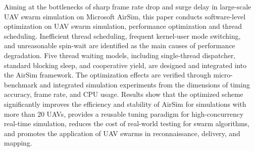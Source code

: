 

\begin{abstracten}

Aiming at the bottlenecks of sharp frame rate drop and surge delay in
large-scale UAV swarm simulation on Microsoft AirSim, this paper
conducts software-level optimization on UAV swarm simulation,
performance optimization and thread scheduling.  Inefficient thread
scheduling, frequent kernel-user mode switching, and unreasonable
spin-wait are identified as the main causes of performance degradation.
Five thread waiting models, including single-thread dispatcher, standard
blocking sleep, and cooperative yield, are designed and integrated into
the AirSim framework. The optimization effects are verified through
micro-benchmark and integrated simulation experiments from the
dimensions of timing accuracy, frame rate, and CPU usage. Results show
that the optimized scheme significantly improves the efficiency and
stability of AirSim for simulations with more than 20 UAVs, provides a
reusable tuning paradigm for high-concurrency real-time simulation,
reduces the cost of real-world testing for swarm algorithms, and
promotes the application of UAV swarms in reconnaissance, delivery, and
mapping.

\end{abstracten}
